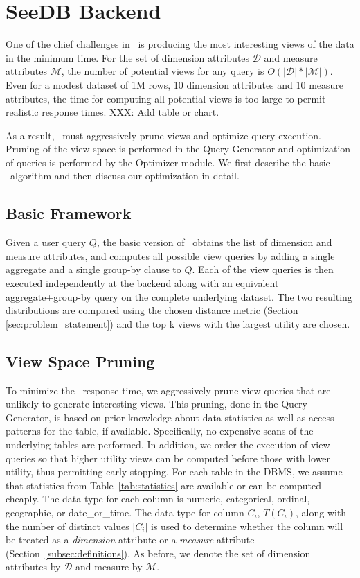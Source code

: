 \section{SeeDB Backend}
\label{subsec:seedb_backend}

One of the chief challenges in \SeeDB\ is producing the most interesting views
of the data in the minimum time. For the set of dimension attributes
$\mathcal{D}$ and measure attributes $\mathcal{M}$, the number of potential
views for any query is $O(|\mathcal{D}| \ast |\mathcal{M}|)$. Even for a modest
dataset of 1M rows, 10 dimension attributes and 10 measure attributes, the time
for computing all potential views is too large to permit realistic response
times. XXX: Add table or chart. 

As a result, \SeeDB\ must aggressively prune views and optimize query execution.
Pruning of the view space is performed in the Query Generator and optimization
of queries is performed by the Optimizer module. We first describe
the basic \SeeDB\ algorithm and then discuss our optimization in detail.

\subsection{Basic Framework}
\label{subsubsec:basic_framework}

Given a user query $Q$, the basic version of \SeeDB\ obtains the list of
dimension and measure attributes, and computes all possible view queries by
adding a single aggregate and a single group-by clause to $Q$. Each of the
view queries is then executed independently at the backend along with an
equivalent aggregate+group-by query on the complete underlying dataset. The two resulting
distributions are compared using the chosen distance metric (Section
\ref{sec:problem_statement}) and the top k views with the largest utility are
chosen.

\subsection{View Space Pruning}
\label{subsubsec:view_space_pruning}

To minimize the \SeeDB\ response time, we aggressively prune view queries that
are unlikely to generate interesting views. This pruning, done in the Query
Generator, is based on prior knowledge about data statistics as well as access
patterns for the table, if available. Specifically, no expensive scans of the underlying
tables are performed. In addition, we order the execution of view queries so
that higher utility views can be computed before those with lower utility,
thus permitting early stopping. For each table in the DBMS, we assume that
statistics from Table~\ref{tab:statistics} are available or can be computed
cheaply. The data type for each column is numeric, categorical, ordinal, geographic, or
date\_or\_time. The data type for column $C_i$, $T(C_i)$, along with the number
of distinct values $|C_i|$ is used to determine whether the column will be
treated as a {\it dimension} attribute or a {\it measure}
attribute (Section~\ref{subsec:definitions}). As before, we denote the set of
dimension attributes by $\mathcal{D}$ and measure by $\mathcal{M}$.


